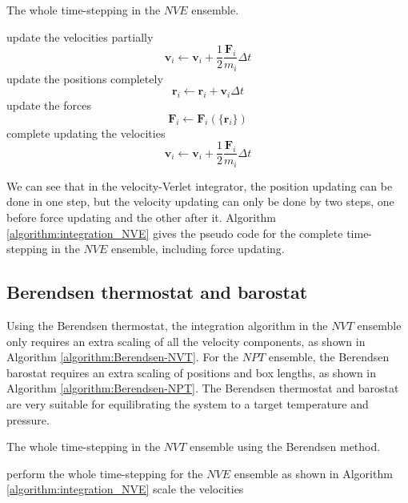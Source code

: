 \documentclass[12pt,a4paper]{report}
\newcommand{\vect}[1]{\boldsymbol{#1}}
\begin{document}
\begin{algorithm}[htb]
\caption{The whole time-stepping in the $NVE$ ensemble. }
\label{algorithm:integration_NVE}
\begin{algorithmic}[1]
\State update the velocities partially
\begin{equation}
\vect{v}_i \leftarrow \vect{v}_i + \frac{1}{2} \frac{\vect{F}_i}{m_i} \Delta t
\end{equation}
\State update the positions completely
\begin{equation}
\vect{r}_i \leftarrow \vect{r}_i + \vect{v}_i \Delta t
\end{equation}
\State update the forces
\begin{equation}
\vect{F}_i \leftarrow \vect{F}_i(\{\vect{r}_i\})
\end{equation}
\State complete updating the velocities
\begin{equation}
\vect{v}_i \leftarrow \vect{v}_i + \frac{1}{2} \frac{\vect{F}_i}{m_i} \Delta t
\end{equation}
 \end{algorithmic}
\end{algorithm}

We can see that in the velocity-Verlet integrator, the position updating can be done in one step, but the velocity updating can only be done by two steps, one before force updating and the other after it. Algorithm \ref{algorithm:integration_NVE} gives the pseudo code for the complete time-stepping in the $NVE$ ensemble, including force updating.


\subsection{Berendsen thermostat and barostat}

Using the Berendsen thermostat, the integration algorithm in the $NVT$ ensemble only requires an extra scaling of all the velocity components, as shown in Algorithm \ref{algorithm:Berendsen-NVT}. For the $NPT$ ensemble, the Berendsen barostat requires an extra scaling of positions and box lengths, as shown in Algorithm \ref{algorithm:Berendsen-NPT}. The Berendsen thermostat and barostat are very suitable for equilibrating the system to a target temperature and pressure.

\begin{algorithm}[htb]
\caption{The whole time-stepping in the $NVT$ ensemble using the Berendsen method. }
\label{algorithm:Berendsen-NVT}
\begin{algorithmic}[1]
\State perform the whole time-stepping for the $NVE$ ensemble as shown in Algorithm \ref{algorithm:integration_NVE}
\State scale the velocities
\end{algorithmic}
\end{algorithm}
\end{document}
